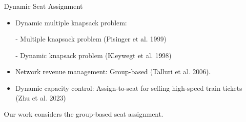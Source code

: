       \begin{frame}{Dynamic Seat Assignment}
        \begin{itemize}
          \item {\color{red}Dynamic multiple} knapsack problem:
          \vspace*{0.1cm}
          
          -  Multiple knapsack problem (Pisinger et al. 1999)
          
          - Dynamic knapsack problem (Kleywegt et al. 1998)


          \vspace*{0.3cm}


          \item Network revenue management: {\color{red} Group-based} (Talluri et al. 2006).

          \vspace*{0.5cm}
          \item Dynamic capacity control: {\color{red} Assign-to-seat} for selling high-speed train
          tickets (Zhu et al. 2023)
        \end{itemize}

        \vspace*{0.4cm}

        \qquad Our work considers the group-based seat assignment.
      \end{frame}